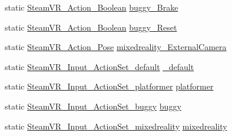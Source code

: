 \begin{DoxyCompactItemize}
\item 
static \mbox{\hyperlink{class_valve_1_1_v_r_1_1_steam_v_r___action___boolean}{Steam\+V\+R\+\_\+\+Action\+\_\+\+Boolean}} \mbox{\hyperlink{class_valve_1_1_v_r_1_1_steam_v_r___actions_ae1ff73f3a952c6b393aa1303a1c2267f}{buggy\+\_\+\+Brake}}
\item 
static \mbox{\hyperlink{class_valve_1_1_v_r_1_1_steam_v_r___action___boolean}{Steam\+V\+R\+\_\+\+Action\+\_\+\+Boolean}} \mbox{\hyperlink{class_valve_1_1_v_r_1_1_steam_v_r___actions_ab471c0b282491b703ae2081a528605ee}{buggy\+\_\+\+Reset}}
\item 
static \mbox{\hyperlink{class_valve_1_1_v_r_1_1_steam_v_r___action___pose}{Steam\+V\+R\+\_\+\+Action\+\_\+\+Pose}} \mbox{\hyperlink{class_valve_1_1_v_r_1_1_steam_v_r___actions_a147dcf57856069832c326ce0b0be4eec}{mixedreality\+\_\+\+External\+Camera}}
\item 
static \mbox{\hyperlink{class_valve_1_1_v_r_1_1_steam_v_r___input___action_set__default}{Steam\+V\+R\+\_\+\+Input\+\_\+\+Action\+Set\+\_\+default}} \mbox{\hyperlink{class_valve_1_1_v_r_1_1_steam_v_r___actions_a02ff0421f892466ae8108b9547447af2}{\+\_\+default}}
\item 
static \mbox{\hyperlink{class_valve_1_1_v_r_1_1_steam_v_r___input___action_set__platformer}{Steam\+V\+R\+\_\+\+Input\+\_\+\+Action\+Set\+\_\+platformer}} \mbox{\hyperlink{class_valve_1_1_v_r_1_1_steam_v_r___actions_a68d8a7897c689a1341fd442b2cddc5ff}{platformer}}
\item 
static \mbox{\hyperlink{class_valve_1_1_v_r_1_1_steam_v_r___input___action_set__buggy}{Steam\+V\+R\+\_\+\+Input\+\_\+\+Action\+Set\+\_\+buggy}} \mbox{\hyperlink{class_valve_1_1_v_r_1_1_steam_v_r___actions_a333f7e756c7d9ca824510dd83557d46e}{buggy}}
\item 
static \mbox{\hyperlink{class_valve_1_1_v_r_1_1_steam_v_r___input___action_set__mixedreality}{Steam\+V\+R\+\_\+\+Input\+\_\+\+Action\+Set\+\_\+mixedreality}} \mbox{\hyperlink{class_valve_1_1_v_r_1_1_steam_v_r___actions_a5fa63d4698c6daf5ed5784282d78cc91}{mixedreality}}
\end{DoxyCompactItemize}



